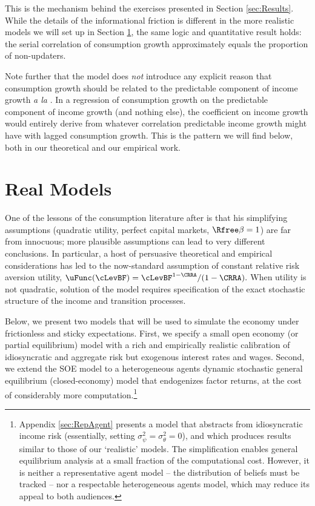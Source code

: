 \documentclass[titlepage]{\econtex}\newcommand{\texname}{cAndCwithStickyE}
\begin{document}
This is the mechanism behind the exercises presented in Section \ref{sec:Results}.  While the details of the informational friction is different in the more realistic models we will set up in Section \ref{sec:models}, the same logic and quantitative result holds: the serial correlation of consumption growth approximately equals the proportion of non-updaters.

Note further that the model does {\it not} introduce any explicit reason that consumption growth should be related to the predictable component of income growth {\it a la} \cite{cmModel}.  In a regression of consumption growth on the predictable component of income growth (and nothing else), the coefficient on income growth would entirely derive from whatever correlation predictable income growth might have with lagged consumption growth.  This is the pattern we will find below, both in our theoretical and our empirical work.



\section{Real Models}
\label{sec:models}

One of the lessons of the consumption literature after \cite{hallRandomWalk} is that his simplifying assumptions (quadratic utility, perfect capital markets, $\Rfree\beta=1$) are far from innocuous; more plausible assumptions can lead to very different conclusions.  In particular, a host of persuasive theoretical and empirical considerations has led to the now-standard assumption of constant relative risk aversion utility, $\uFunc(\cLevBF)=\cLevBF^{1-\CRRA}/(1-\CRRA).$ When utility is not quadratic, solution of the model requires specification of the exact stochastic structure of the income and transition processes.

Below, we present two models that will be used to simulate the economy under frictionless and sticky expectations.  First, we specify a small open economy (or partial equilibrium) model with a rich and empirically realistic calibration of idiosyncratic and aggregate risk but exogenous interest rates and wages. Second, we extend the SOE model to a heterogeneous agents dynamic stochastic general equilibrium (closed-economy) model that endogenizes factor returns, at the cost of considerably more computation.\footnote{Appendix \ref{sec:RepAgent} presents a model that abstracts from idiosyncratic income risk (essentially, setting $\sigma^{2}_{\psi}=\sigma^{2}_{\theta}=0$), and which produces results similar to those of our `realistic' models.  The simplification enables general equilibrium analysis at a small fraction of the computational cost. However, it is neither a representative agent model -- the distribution of beliefs must be tracked -- nor a respectable heterogeneous agents model, which may reduce its appeal to both audiences.}
\end{document}
